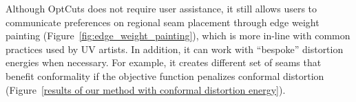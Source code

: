 

Although OptCuts does not require user assistance, it still allows users to communicate preferences on regional seam placement through edge weight painting (Figure~\ref{fig:edge_weight_painting}), which is more in-line with common practices used by UV artists.  In addition, it can work with ``bespoke'' distortion energies when necessary. For example, it creates different set of seams that benefit conformality if the objective function penalizes conformal distortion (Figure~\ref{results of our method with conformal distortion energy}).

